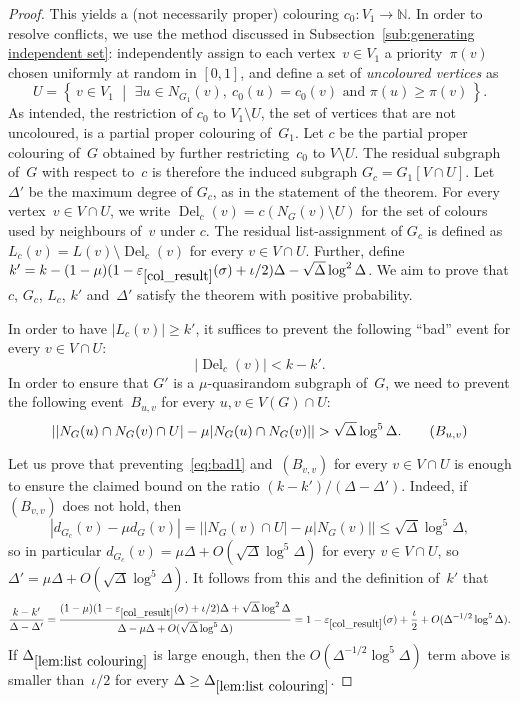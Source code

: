 \documentclass[11pt]{article}
\theoremstyle{plain}
\DeclareMathOperator{\Del}{Del}
\newcommand{\del}{\Del_c}
\newcommand{\sst}[2]{\left\{\,#1 \,\,\middle|\,\, #2\,\right\}}
\newcommand{\N}{\mathbb{N}}
\newcommand{\eps}{\varepsilon}
\begin{document}
\begin{proof}
This yields a (not necessarily proper) colouring $c_0:V_1\to\N$.
In order to resolve conflicts, we use the method discussed in Subsection~\ref{sub:generating independent set}:
independently assign to each vertex~$v\in V_1$ a priority~$\pi(v)$ chosen uniformly at random in $[0,1]$,
and define a set of \emph{uncoloured vertices} as
\[
U=\sst{v\in V_1}{\exists u\in N_{G_1}(v), ~c_0(u)=c_0(v)\text{ and }\pi(u)\ge\pi(v)}.
\]
As intended, the restriction of $c_0$ to $V_1\setminus U$,
the set of vertices that are not uncoloured,
is a partial proper colouring of~$G_1$.
Let $c$ be the partial proper colouring of~$G$ obtained by further restricting~$c_0$
to $V\setminus U$.
The residual subgraph of~$G$ with respect to~$c$ is therefore the induced subgraph $G_c=G_1[V\cap U]$.
Let~$\Delta'$ be the maximum degree of $G_c$, as in the statement of the theorem.
For every vertex~$v\in V\cap U$,
we write $\del(v)=c(N_G(v)\setminus U)$
for the set of colours used by neighbours of~$v$ under $c$.
The residual list-assignment of $G_c$ is defined as
$L_c(v)=L(v)\setminus \del(v)$ for every $v\in V\cap U$.
Further, define $k'= k-(1-\mu)(1-\eps_{\ref{col_result}}(\sigma)+\iota/2)\Delta - \sqrt{\Delta}\log^2\Delta$.
We aim to prove that $c$, $G_c$, $L_c$, $k'$ and~$\Delta'$ satisfy the theorem with positive
probability.

In order to have $|L_c(v)|\geq k'$,
it suffices to prevent the following ``bad'' event for every $v\in V\cap U$:
\begin{equation}\label{eq:bad1}
  |\del(v)| < k-k'
  \tag{$B_v$}.
\end{equation}
In order to ensure that $G'$ is a $\mu$-quasirandom subgraph of~$G$, we need to prevent
the following event~$B_{u,v}$
for every $u,v\in V(G)\cap U$:
\begin{equation}\label{eq:bad2}
\left||N_G(u)\cap N_G(v)\cap U|-\mu|N_G(u)\cap N_G(v)| \right|> \sqrt\Delta\log^5\Delta
.
\tag{$B_{u,v}$}
\end{equation}

Let us prove that preventing~\eqref{eq:bad1} and~$(B_{v,v})$ %
for every $v\in V\cap U$ is enough to ensure the claimed
bound on the ratio $(k-k')/(\Delta-\Delta')$.
Indeed, if $(B_{v,v})$ does not hold, then
\[|d_{G_c}(v)-\mu d_{G}(v)|=\left||N_{G}(v)\cap U|- \mu |N_G(v)|\right|\le \sqrt{\Delta}\log^5\Delta,\]
so in particular $d_{G_c}(v)=\mu\Delta + O(\sqrt{\Delta}\log^5\Delta)$
for every $v\in V\cap U$,
so $\Delta'=\mu\Delta + O(\sqrt{\Delta}\log^5\Delta)$.
It follows from this and the definition of~$k'$ that
\[
\frac{k-k'}{\Delta-\Delta'} =
\frac{(1-\mu)(1-\eps_{\ref{col_result}}(\sigma)+\iota/2)\Delta+ \sqrt\Delta\log^2\Delta}{\Delta-\mu\Delta + O(\sqrt{\Delta}\log^5\Delta)}= 1-\eps_{\ref{col_result}}(\sigma)+\frac\iota2+ O(\Delta^{-1/2}\log^5\Delta).
\]
If $\Delta_{\ref{lem:list colouring}}$ is large enough, then the
$O(\Delta^{-1/2}\log^5\Delta)$ term above is smaller than~$\iota/2$
for every $\Delta\ge\Delta_{\ref{lem:list colouring}}$.


\end{proof}
\end{document}
